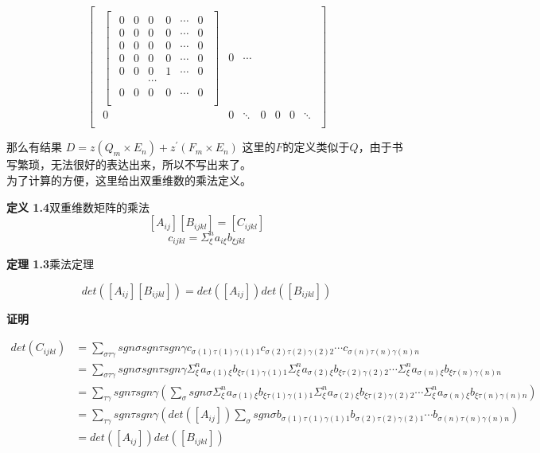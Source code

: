 \documentclass[twoside,a4paper,CCT]{cctart}   %
\begin{document}
$$\begin{bmatrix}
\begin{smallmatrix}
 \begin{bmatrix}\begin{smallmatrix}
  0& 0& 0&0&\cdots&0\\
 0& 0& 0&0&\cdots&0\\
 0& 0& 0&0&\cdots&0\\
 0& 0& 0&0&\cdots&0\\
 0& 0& 0&1&\cdots&0\\
 & & \cdots& &\\
0& 0& 0& 0&\cdots&0\\
 \end{smallmatrix}\end{bmatrix}& 0& \cdots&\\
 0& 0& \ddots &0 &0 &0 &\ddots \\
\end{smallmatrix}\end{bmatrix}$$

那么有结果
$D=z(Q_{m}\times E_{n})  +  z^{'} (F_{m} \times E_{n})$
这里的$F$的定义类似于$Q$，由于书写繁琐，无法很好的表达出来，所以不写出来了。\\
为了计算的方便，这里给出双重维数的乘法定义。

{\bf 定义 1.4}\quad  双重维数矩阵的乘法
   $$[A_{ij}][B_{ijkl}]=[C_{ijkl}]$$
   $$c_{ijkl} = \Sigma_{\xi}^{n}a_{i\xi}b_{\xi jkl}$$

{\bf 定理 1.3}\quad  乘法定理

    $$det([A_{ij}][B_{ijkl}])=det([A_{ij}])det([B_{ijkl}])$$

{\bf 证明}\quad

\begin{align*}
det(C_{ijkl})&=\sum \limits_{\sigma\tau\gamma}sgn\sigma sgn\tau sgn\gamma c_{\sigma(1)\tau(1)\gamma(1)1} c_{\sigma(2)\tau(2)\gamma(2)2}\cdots c_{\sigma(n)\tau(n)\gamma(n)n}\\
&=\sum \limits_{\sigma\tau\gamma}sgn\sigma sgn\tau sgn\gamma \Sigma_{\xi}^{n}a_{\sigma(1)\xi}b_{\xi \tau(1)\gamma(1)1} \Sigma_{\xi}^{n}a_{\sigma(2)\xi}b_{\xi \tau(2)\gamma(2)2}\cdots \Sigma_{\xi}^{n}a_{\sigma(n)\xi}b_{\xi \tau(n)\gamma(n)n}\\
&=\sum \limits_{\tau\gamma}sgn\tau sgn\gamma(\sum \limits_{\sigma}sgn\sigma  \Sigma_{\xi}^{n}a_{\sigma(1)\xi}b_{\xi \tau(1)\gamma(1)1} \Sigma_{\xi}^{n}a_{\sigma(2)\xi}b_{\xi \tau(2)\gamma(2)2}\cdots \Sigma_{\xi}^{n}a_{\sigma(n)\xi}b_{\xi \tau(n)\gamma(n)n})\\
&=\sum \limits_{\tau\gamma}sgn\tau sgn\gamma(det([A_{ij}])\sum \limits_{\sigma}sgn\sigma b_{\sigma(1) \tau(1)\gamma(1)1} b_{\sigma(2) \tau(2)\gamma(2)1} \cdots b_{\sigma(n) \tau(n)\gamma(n)n})\\
&=det([A_{ij}])det([B_{ijkl}])
\end{align*}
\end{document}
